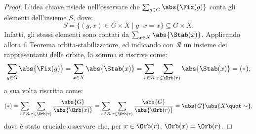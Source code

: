 \documentclass[12pt]{scrartcl}
\begin{document}
	\begin{proof}
		L'idea chiave risiede nell'osservare che $\sum_{g \in G} \abs{\Fix(g)}$ conta
		gli elementi dell'insieme $S$, dove:
		\[ S = \{ (g, x) \in G \times X \mid g \cdot x = x \} \subseteq G \times X. \]
		Infatti, gli stessi elementi sono contati da $\sum_{x \in X} \abs{\Stab(x)}$.
		Applicando allora il Teorema orbita-stabilizzatore, ed indicando
		con $\mathcal{R}$ un insieme dei rappresentanti delle orbite, la
		somma si riscrive come:
		\[ \sum_{g \in G} \abs{\Fix(g)} = \sum_{x \in X} \abs{\Stab(x)} =
		\sum_{r \in \mathcal{R}} \sum_{x \in \Orb(r)} \abs{\Stab(x)} = (*),
		 \]
		 a sua volta riscritta come:
		 \[ (*) = \sum_{r \in \mathcal{R}} \sum_{x \in \Orb(r)} \frac{\abs{G}}{\abs{\Orb(x)}} = \sum_{r \in \mathcal{R}} \sum_{x \in \Orb(r)} \frac{\abs{G}}{\abs{\Orb(r)}} = \abs{G} \abs{X \quot \sim}, \]
		 dove è stato cruciale osservare che, per $x \in \Orb(r)$, $\Orb(x) = \Orb(r)$.
	\end{proof}
\end{document}
